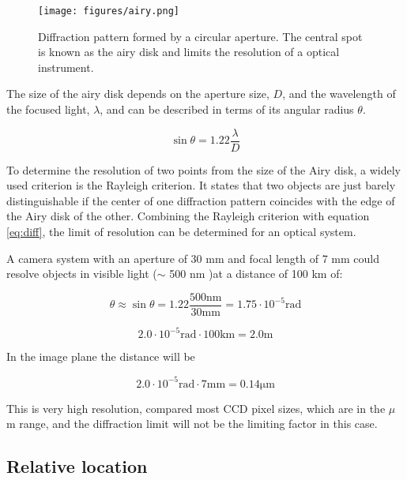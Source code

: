 \begin{figure}[H]
\begin{center}
\texttt{[image: figures/airy.png]}
\caption{Diffraction pattern formed by a circular aperture. The central spot is known as the airy disk and limits the resolution of a optical instrument.}
\label{airy}
\end{center}
\end{figure}

The size of the airy disk depends on the aperture size, $D$, and the wavelength of the focused light, $\lambda$, and can be described in terms of its angular radius $\theta$.

\begin{equation}
\label{eq:diff}
\sin \theta = 1.22 \dfrac{\lambda}{D}
\end{equation}

To determine the resolution of two points from the size of the Airy disk, a widely used criterion is the Rayleigh criterion. It states that two objects are just barely distinguishable if the center of one diffraction pattern coincides with the edge of the Airy disk of the other. Combining the Rayleigh criterion with equation \ref{eq:diff}, the limit of resolution can be determined for an optical system. 

A camera system with an aperture of 30 mm and focal length of 7 mm could resolve objects in visible light ($\sim$ 500 nm )at a distance of 100  km of: 

\begin{equation}
\theta\approx \sin \theta=1.22 \dfrac{500 \mathrm{nm}}{30 \mathrm{mm}} = 1.75 \cdot 10^{-5} \mathrm{rad}
\end{equation} 


\begin{equation}
2.0 \cdot 10 ^{-5} \mathrm{rad} \cdot 100 \mathrm{km} = 2.0 \mathrm{m} 
\end{equation}

In the image plane the distance will be

\begin{equation}
2.0 \cdot 10 ^{-5} \mathrm{rad} \cdot 7 \mathrm{mm} = 0.14 \mathrm{\mu m} 
\end{equation}

This is very high resolution, compared most CCD pixel sizes, which are in the $\mu$ m range, and the diffraction limit will not be the limiting factor in this case. 




\subsection{Relative location}


